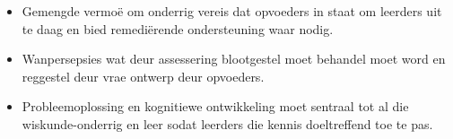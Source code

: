\begin{itemize}[noitemsep]
\item
Gemengde vermoë om onderrig vereis dat opvoeders in staat om leerders uit te daag en bied remediërende ondersteuning waar nodig.
\item
Wanpersepsies wat deur assessering blootgestel moet behandel moet word en reggestel deur vrae ontwerp deur opvoeders.
\item
Probleemoplossing en kognitiewe ontwikkeling moet sentraal tot al die wiskunde-onderrig en leer sodat leerders die kennis doeltreffend toe te pas.
\end{itemize}

